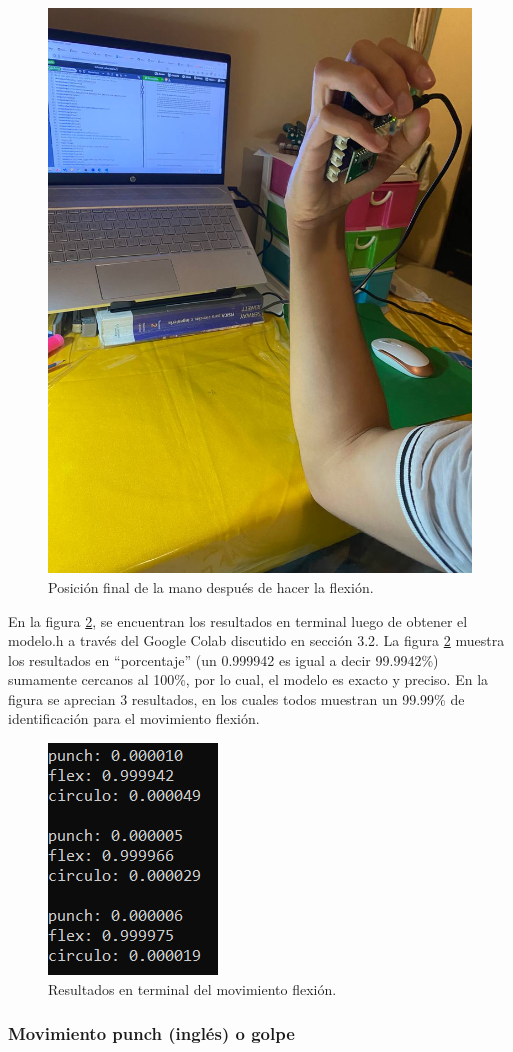     \begin{figure}[H]
        \centering
        \includegraphics[width=0.5\linewidth]{pics/flex2.jpg}
        \caption{Posición final de la mano después de hacer la flexión.}
        \label{flex2}
    \end{figure}

En la figura \ref{flex3}, se encuentran los resultados en terminal luego de obtener el modelo.h a través del Google Colab discutido en sección 3.2. La figura \ref{flex3} muestra los resultados en ``porcentaje'' (un 0.999942 es igual a decir 99.9942\%) sumamente cercanos al 100\%, por lo cual, el modelo es exacto y preciso. En la figura se aprecian 3 resultados, en los cuales todos muestran un 99.99\% de identificación para el movimiento flexión.

    \begin{figure}[H]
        \centering
        \includegraphics[width=0.3\linewidth]{pics/flex3.png}
        \caption{Resultados en terminal del movimiento flexión.}
        \label{flex3}
    \end{figure}
\subsubsection{Movimiento punch (inglés) o golpe}

